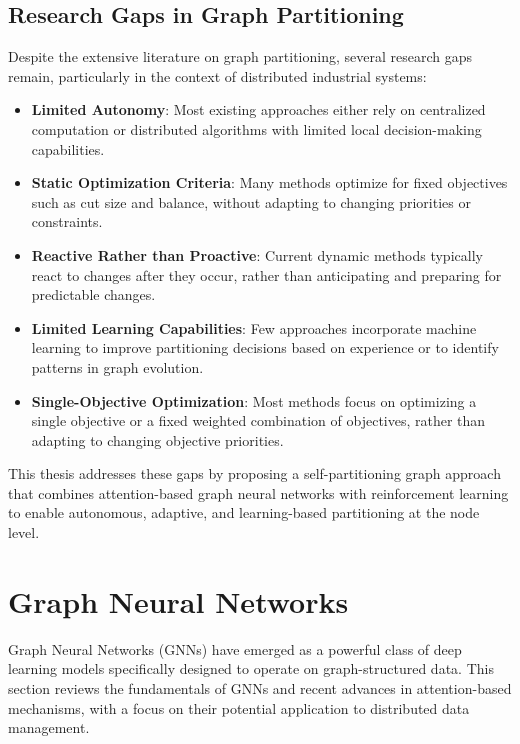 \documentclass{article}
\begin{document}
\subsection{Research Gaps in Graph Partitioning}

Despite the extensive literature on graph partitioning, several research gaps remain, particularly in the context of distributed industrial systems:

\begin{itemize}
    \item \textbf{Limited Autonomy}: Most existing approaches either rely on centralized computation or distributed algorithms with limited local decision-making capabilities.
    
    \item \textbf{Static Optimization Criteria}: Many methods optimize for fixed objectives such as cut size and balance, without adapting to changing priorities or constraints.
    
    \item \textbf{Reactive Rather than Proactive}: Current dynamic methods typically react to changes after they occur, rather than anticipating and preparing for predictable changes.
    
    \item \textbf{Limited Learning Capabilities}: Few approaches incorporate machine learning to improve partitioning decisions based on experience or to identify patterns in graph evolution.
    
    \item \textbf{Single-Objective Optimization}: Most methods focus on optimizing a single objective or a fixed weighted combination of objectives, rather than adapting to changing objective priorities.
\end{itemize}

This thesis addresses these gaps by proposing a self-partitioning graph approach that combines attention-based graph neural networks with reinforcement learning to enable autonomous, adaptive, and learning-based partitioning at the node level.

\section{Graph Neural Networks}

Graph Neural Networks (GNNs) have emerged as a powerful class of deep learning models specifically designed to operate on graph-structured data. This section reviews the fundamentals of GNNs and recent advances in attention-based mechanisms, with a focus on their potential application to distributed data management.
\end{document}
